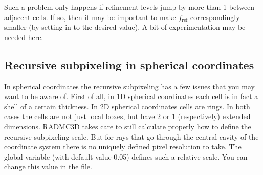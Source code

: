 \documentclass[letterpaper,10pt,english]{sphinxmanual}
\begin{document}
Such a problem only happens if refinement levels jump by more than 1 between
adjacent cells. If so, then it may be important to make \(f_{\mathrm{ref}}\)
correspondingly smaller (by setting  in
 to the desired value). A bit of experimentation may
be needed here.


\subsection{Recursive sub\sphinxhyphen{}pixeling in spherical coordinates}
\label{\detokenize{imagesspectra:recursive-sub-pixeling-in-spherical-coordinates}}\label{\detokenize{imagesspectra:sec-rec-subpixel-spher-coord}}
In spherical coordinates the recursive sub\sphinxhyphen{}pixeling has a few issues that
you may want to be aware of. First of all, in 1\sphinxhyphen{}D spherical coordinates each
cell is in fact a shell of a certain thickness. In 2\sphinxhyphen{}D spherical coordinates
cells are rings. In both cases the cells are not just local boxes, but have
2 or 1 (respectively) extended dimensions. RADMC\sphinxhyphen{}3D takes care to still
calculate properly how to define the recursive sub\sphinxhyphen{}pixeling scale. But
for rays that go through the central cavity of the coordinate
system there is no uniquely defined pixel resolution to take. The
global variable  (with default
value 0.05) defines such a relative scale. You can change this value
in the  file.
\end{document}

